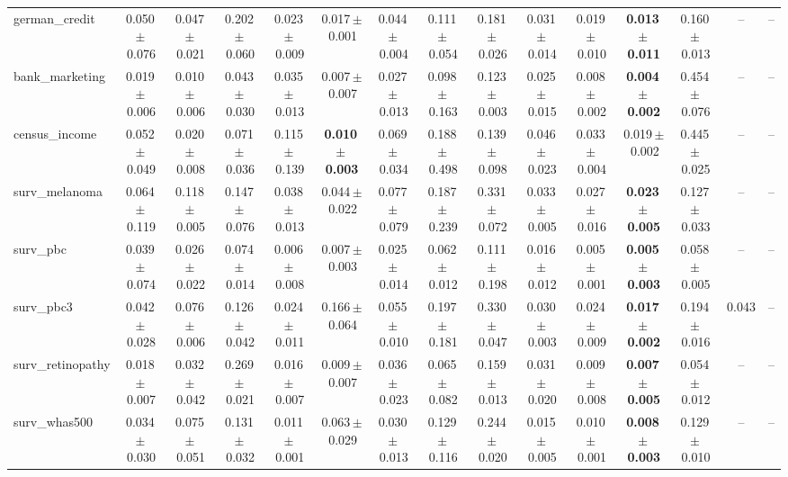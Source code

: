 \documentclass[8pt]{extarticle}
\begin{document}
\begin{longtable}{l*{14}{c}}
german\_credit & 0.050\,$\pm$\,0.076 & 0.047\,$\pm$\,0.021 & 0.202\,$\pm$\,0.060 & 0.023\,$\pm$\,0.009 & 0.017\,$\pm$\,0.001 & 0.044\,$\pm$\,0.004 & 0.111\,$\pm$\,0.054 & 0.181\,$\pm$\,0.026 & 0.031\,$\pm$\,0.014 & 0.019\,$\pm$\,0.010 & \textbf{0.013\,$\pm$\,0.011} & 0.160\,$\pm$\,0.013 & -- & -- \\
bank\_marketing & 0.019\,$\pm$\,0.006 & 0.010\,$\pm$\,0.006 & 0.043\,$\pm$\,0.030 & 0.035\,$\pm$\,0.013 & 0.007\,$\pm$\,0.007 & 0.027\,$\pm$\,0.013 & 0.098\,$\pm$\,0.163 & 0.123\,$\pm$\,0.003 & 0.025\,$\pm$\,0.015 & 0.008\,$\pm$\,0.002 & \textbf{0.004\,$\pm$\,0.002} & 0.454\,$\pm$\,0.076 & -- & -- \\
census\_income & 0.052\,$\pm$\,0.049 & 0.020\,$\pm$\,0.008 & 0.071\,$\pm$\,0.036 & 0.115\,$\pm$\,0.139 & \textbf{0.010\,$\pm$\,0.003} & 0.069\,$\pm$\,0.034 & 0.188\,$\pm$\,0.498 & 0.139\,$\pm$\,0.098 & 0.046\,$\pm$\,0.023 & 0.033\,$\pm$\,0.004 & 0.019\,$\pm$\,0.002 & 0.445\,$\pm$\,0.025 & -- & -- \\
surv\_melanoma & 0.064\,$\pm$\,0.119 & 0.118\,$\pm$\,0.005 & 0.147\,$\pm$\,0.076 & 0.038\,$\pm$\,0.013 & 0.044\,$\pm$\,0.022 & 0.077\,$\pm$\,0.079 & 0.187\,$\pm$\,0.239 & 0.331\,$\pm$\,0.072 & 0.033\,$\pm$\,0.005 & 0.027\,$\pm$\,0.016 & \textbf{0.023\,$\pm$\,0.005} & 0.127\,$\pm$\,0.033 & -- & -- \\
surv\_pbc & 0.039\,$\pm$\,0.074 & 0.026\,$\pm$\,0.022 & 0.074\,$\pm$\,0.014 & 0.006\,$\pm$\,0.008 & 0.007\,$\pm$\,0.003 & 0.025\,$\pm$\,0.014 & 0.062\,$\pm$\,0.012 & 0.111\,$\pm$\,0.198 & 0.016\,$\pm$\,0.012 & 0.005\,$\pm$\,0.001 & \textbf{0.005\,$\pm$\,0.003} & 0.058\,$\pm$\,0.005 & -- & -- \\
surv\_pbc3 & 0.042\,$\pm$\,0.028 & 0.076\,$\pm$\,0.006 & 0.126\,$\pm$\,0.042 & 0.024\,$\pm$\,0.011 & 0.166\,$\pm$\,0.064 & 0.055\,$\pm$\,0.010 & 0.197\,$\pm$\,0.181 & 0.330\,$\pm$\,0.047 & 0.030\,$\pm$\,0.003 & 0.024\,$\pm$\,0.009 & \textbf{0.017\,$\pm$\,0.002} & 0.194\,$\pm$\,0.016 & 0.043 & -- \\
surv\_retinopathy & 0.018\,$\pm$\,0.007 & 0.032\,$\pm$\,0.042 & 0.269\,$\pm$\,0.021 & 0.016\,$\pm$\,0.007 & 0.009\,$\pm$\,0.007 & 0.036\,$\pm$\,0.023 & 0.065\,$\pm$\,0.082 & 0.159\,$\pm$\,0.013 & 0.031\,$\pm$\,0.020 & 0.009\,$\pm$\,0.008 & \textbf{0.007\,$\pm$\,0.005} & 0.054\,$\pm$\,0.012 & -- & -- \\
surv\_whas500 & 0.034\,$\pm$\,0.030 & 0.075\,$\pm$\,0.051 & 0.131\,$\pm$\,0.032 & 0.011\,$\pm$\,0.001 & 0.063\,$\pm$\,0.029 & 0.030\,$\pm$\,0.013 & 0.129\,$\pm$\,0.116 & 0.244\,$\pm$\,0.020 & 0.015\,$\pm$\,0.005 & 0.010\,$\pm$\,0.001 & \textbf{0.008\,$\pm$\,0.003} & 0.129\,$\pm$\,0.010 & -- & -- \\

\end{longtable}
\end{document}
